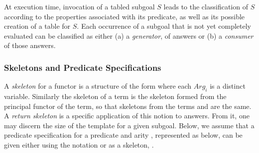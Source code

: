 At execution time, invocation of a tabled subgoal $S$ leads to the
classification of $S$ according to the properties associated with its
predicate, as well as its possible creation of a table for $S$.  Each
occurrence of a subgoal that is not yet completely evaluated can be
classified as either (a) a \emph{generator}, of answers or (b) a
\emph{consumer} of those answers. 





\subsubsection*{Skeletons and Predicate Specifications}


A \emph{skeleton} for a functor  is a structure of the form
 where each $Arg_i$ is a distinct
variable.  Similarly the skeleton of a term is the skeleton formed
from the principal functor of the term, so that skeletons from the
terms  and  are the same.  A \emph{return
  skeleton} is a specific application of this notion to answers.  From
it, one may discern the size of the template for a given subgoal.
Below, we assume that a predicate specification for a predicate
 and arity , represented as  below, can
be given either using the notation  or as a skeleton,
.


